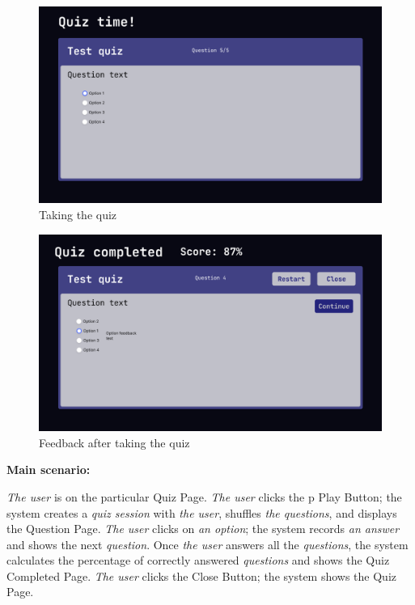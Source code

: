 \documentclass[
    english, %
]{VUMIFPSkursinis}
\begin{document}
\begin{figure}[ht]
    \centering
    \includegraphics[width=\textwidth]{../lab3diags/Quiz play (User).png}
    \caption{Taking the quiz}
    \label{wireframe-quiz-play}
\end{figure}

\begin{figure}[ht]
    \centering
    \includegraphics[width=\textwidth]{../lab3diags/Quiz completed (User).png}
    \caption{Feedback after taking the quiz}
    \label{wireframe-quiz-completed}
\end{figure}

\noindent\textbf{\fontsize{13}{15}\selectfont Main scenario:}

\textit{The user} is on the particular Quiz Page. \textit{The user} clicks the p
Play Button; the system creates a \textit{quiz session} with \textit{the user}, shuffles \textit{the questions}, and displays the Question Page. \textit{The user} clicks on \textit{an option}; the system records \textit{an answer} and shows the next \textit{question}. Once \textit{the user} answers all the \textit{questions}, the system calculates the percentage of correctly answered \textit{questions} and shows the Quiz Completed Page. \textit{The user} clicks the Close Button; the system shows the Quiz Page.
\end{document}
